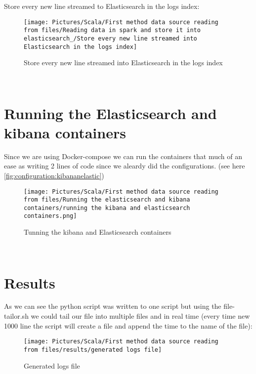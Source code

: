 \begin{spacing}{1.2}
\par Store every new line streamed to Elasticsearch in the logs index:
\\
\begin{figure}[!htb] 
\begin{center} 
\texttt{[image: Pictures/Scala/First method data source reading from files/Reading data in spark and store it into elasticsearch\_/Store every new line streamed into Elasticsearch in the logs index]} 
\end{center} 
\caption{Store every new line streamed into Elasticsearch in the logs index} 
\end{figure}  \FloatBarrier
\\
\newpage
\section{Running the Elasticsearch and kibana containers }
\par Since we are using Docker-compose we can run the containers that much of an ease as writing 2 lines of code since we aleardy did the configurations. (see here \ref{fig:configuration:kibananelastic})
\\
\begin{figure}[!htb] 
\begin{center} 
\texttt{[image: Pictures/Scala/First method data source reading from files/Running the elasticsearch and kibana containers/running the kibana and elasticsearch containers.png]} 
\end{center} 
\caption{Tunning the kibana and Elasticsearch containers} 
\end{figure}  \FloatBarrier
\\
\section{Results }
\par As we can see the python script was written to one script but using the file-tailor.sh we could tail our file into multiple files and in real time (every time new 1000 line the script will create a file and append the time to the name of the file):
\\
\begin{figure}[!htb] 
\begin{center} 
\texttt{[image: Pictures/Scala/First method data source reading from files/results/generated logs file]} 
\end{center} 
\caption{Generated logs file} 
\end{figure}  \FloatBarrier
\\


\end{spacing}
